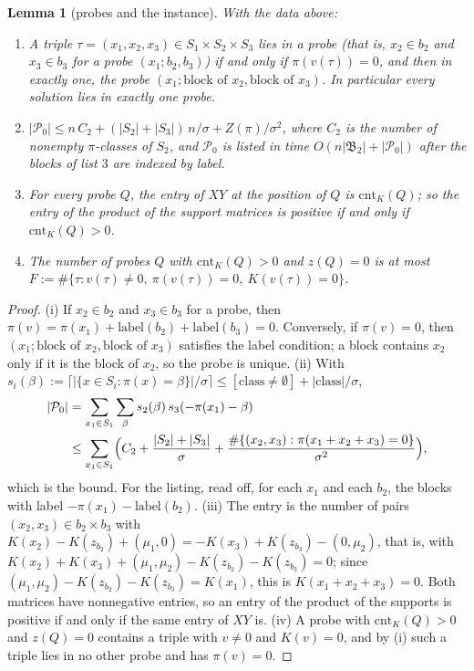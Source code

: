 \documentclass[11pt]{article}
\newtheorem{lemma}[theorem]{Lemma}
\theoremstyle{definition}
\theoremstyle{remark}
\newcommand{\cnt}{\mathrm{cnt}}
\newcommand{\Pq}{\mathcal{P}}
\begin{document}
\begin{lemma}[probes and the instance]\label{g:lem:instance}
With the data above:
\begin{enumerate}[label=\textup{(\roman*)}]
\item A triple $\tau=(x_1,x_2,x_3)\in S_1\times S_2\times S_3$ lies in a probe (that is, $x_2\in b_2$ and $x_3\in b_3$ for a probe $(x_1;b_2,b_3)$) if and only if $\pi(v(\tau))=0$, and then in exactly one, the probe $(x_1;\text{block of }x_2,\text{block of }x_3)$. In particular every solution lies in exactly one probe.
\item $|\Pq_0|\le n\,C_2+(|S_2|+|S_3|)\,n/\sigma+Z(\pi)/\sigma^2$, where $C_2$ is the number of nonempty $\pi$-classes of $S_2$, and $\Pq_0$ is listed in time $O(n|\mathfrak B_2|+|\Pq_0|)$ after the blocks of list $3$ are indexed by label.
\item For every probe $Q$, the entry of $XY$ at the position of $Q$ is $\cnt_K(Q)$; so the entry of the product of the support matrices is positive if and only if $\cnt_K(Q)>0$.
\item The number of probes $Q$ with $\cnt_K(Q)>0$ and $z(Q)=0$ is at most $F:=\#\{\tau:v(\tau)\ne0,\ \pi(v(\tau))=0,\ K(v(\tau))=0\}$.
\end{enumerate}
\end{lemma}
\begin{proof}
(i) If $x_2\in b_2$ and $x_3\in b_3$ for a probe, then $\pi(v)=\pi(x_1)+\mathrm{label}(b_2)+\mathrm{label}(b_3)=0$. Conversely, if $\pi(v)=0$, then $(x_1;\text{block of }x_2,\text{block of }x_3)$ satisfies the label condition; a block contains $x_2$ only if it is the block of $x_2$, so the probe is unique.
(ii) With $s_i(\beta):=\lceil|\{x\in S_i:\pi(x)=\beta\}|/\sigma\rceil\le[\text{class}\ne\emptyset]+|\text{class}|/\sigma$,
\begin{align*}
|\Pq_0|&=\sum_{x_1\in S_1}\sum_\beta s_2(\beta)\,s_3(-\pi(x_1)-\beta)\\
&\le\sum_{x_1\in S_1}\Bigl(C_2+\frac{|S_2|+|S_3|}\sigma+\frac{\#\{(x_2,x_3):\pi(x_1+x_2+x_3)=0\}}{\sigma^2}\Bigr),
\end{align*}
which is the bound. For the listing, read off, for each $x_1$ and each $b_2$, the blocks with label $-\pi(x_1)-\mathrm{label}(b_2)$.
(iii) The entry is the number of pairs $(x_2,x_3)\in b_2\times b_3$ with $K(x_2)-K(z_{b_2})+(\mu_1,0)=-K(x_3)+K(z_{b_3})-(0,\mu_2)$, that is, with $K(x_2)+K(x_3)+(\mu_1,\mu_2)-K(z_{b_2})-K(z_{b_3})=0$; since $(\mu_1,\mu_2)-K(z_{b_2})-K(z_{b_3})=K(x_1)$, this is $K(x_1+x_2+x_3)=0$. Both matrices have nonnegative entries, so an entry of the product of the supports is positive if and only if the same entry of $XY$ is.
(iv) A probe with $\cnt_K(Q)>0$ and $z(Q)=0$ contains a triple with $v\ne0$ and $K(v)=0$, and by (i) such a triple lies in no other probe and has $\pi(v)=0$.
\end{proof}
\end{document}
